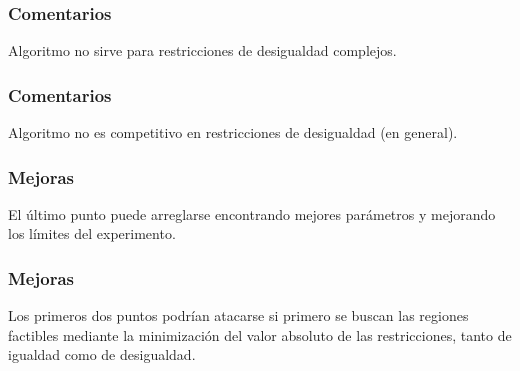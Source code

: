 \documentclass[10pt, compress]{beamer}
\begin{document}
\begin{frame}[fragile]
  \frametitle{Comentarios}
    \begin{center}
         Algoritmo no sirve para restricciones de desigualdad complejos.
    \end{center}{}
\end{frame}

\begin{frame}[fragile]
  \frametitle{Comentarios}
    \begin{center}
         Algoritmo no es competitivo en restricciones de desigualdad (en general).
    \end{center}{}
\end{frame}

\begin{frame}[fragile]
  \frametitle{Mejoras}
    \begin{center}
         El último punto puede arreglarse encontrando mejores parámetros y mejorando los límites del experimento.
    \end{center}{}
\end{frame}

\begin{frame}[fragile]
  \frametitle{Mejoras}
    \begin{center}
         Los primeros dos puntos podrían atacarse si primero se buscan las regiones factibles mediante la minimización del valor absoluto de las restricciones, tanto de igualdad como de desigualdad.
    \end{center}{}
\end{frame}


 
\end{document}
